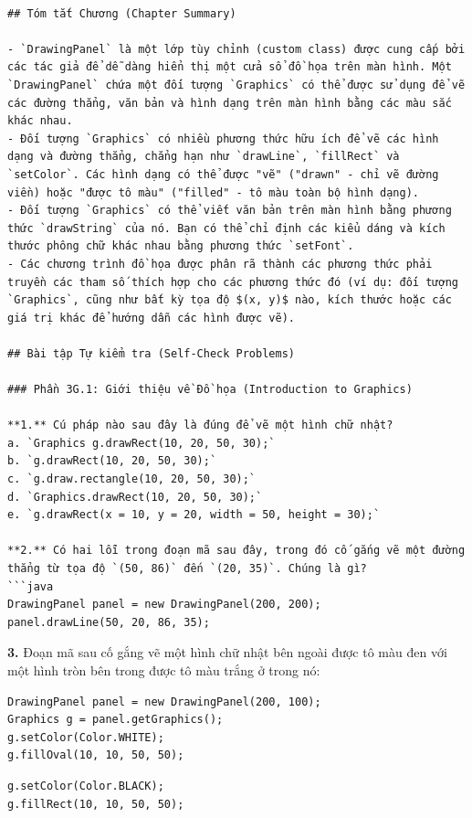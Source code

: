 \begin{verbatim}

## Tóm tắt Chương (Chapter Summary)

- `DrawingPanel` là một lớp tùy chỉnh (custom class) được cung cấp bởi các tác giả để dễ dàng hiển thị một cửa sổ đồ họa trên màn hình. Một `DrawingPanel` chứa một đối tượng `Graphics` có thể được sử dụng để vẽ các đường thẳng, văn bản và hình dạng trên màn hình bằng các màu sắc khác nhau.
- Đối tượng `Graphics` có nhiều phương thức hữu ích để vẽ các hình dạng và đường thẳng, chẳng hạn như `drawLine`, `fillRect` và `setColor`. Các hình dạng có thể được "vẽ" ("drawn" - chỉ vẽ đường viền) hoặc "được tô màu" ("filled" - tô màu toàn bộ hình dạng).
- Đối tượng `Graphics` có thể viết văn bản trên màn hình bằng phương thức `drawString` của nó. Bạn có thể chỉ định các kiểu dáng và kích thước phông chữ khác nhau bằng phương thức `setFont`.
- Các chương trình đồ họa được phân rã thành các phương thức phải truyền các tham số thích hợp cho các phương thức đó (ví dụ: đối tượng `Graphics`, cũng như bất kỳ tọa độ $(x, y)$ nào, kích thước hoặc các giá trị khác để hướng dẫn các hình được vẽ).

## Bài tập Tự kiểm tra (Self-Check Problems)

### Phần 3G.1: Giới thiệu về Đồ họa (Introduction to Graphics)

**1.** Cú pháp nào sau đây là đúng để vẽ một hình chữ nhật?
a. `Graphics g.drawRect(10, 20, 50, 30);`
b. `g.drawRect(10, 20, 50, 30);`
c. `g.draw.rectangle(10, 20, 50, 30);`
d. `Graphics.drawRect(10, 20, 50, 30);`
e. `g.drawRect(x = 10, y = 20, width = 50, height = 30);`

**2.** Có hai lỗi trong đoạn mã sau đây, trong đó cố gắng vẽ một đường thẳng từ tọa độ `(50, 86)` đến `(20, 35)`. Chúng là gì?
```java
DrawingPanel panel = new DrawingPanel(200, 200);
panel.drawLine(50, 20, 86, 35);
\end{verbatim}

\textbf{3.} Đoạn mã sau cố gắng vẽ một hình chữ nhật bên ngoài được tô
màu đen với một hình tròn bên trong được tô màu trắng ở trong nó:

\begin{verbatim}
DrawingPanel panel = new DrawingPanel(200, 100);
Graphics g = panel.getGraphics();
g.setColor(Color.WHITE);
g.fillOval(10, 10, 50, 50);
\end{verbatim}

\begin{verbatim}
g.setColor(Color.BLACK);
g.fillRect(10, 10, 50, 50);
\end{verbatim}

